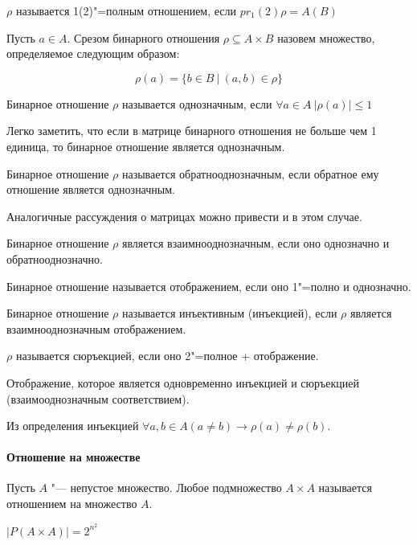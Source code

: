 \begin{definition}
    $\rho$ называется 1(2)"=полным отношением, если $pr_1(2)\rho = A(B)$
\end{definition}

\begin{definition}
    Пусть $a \in A$. Срезом бинарного отношения $\rho \subseteq A \times B$ назовем
    множество, определяемое следующим образом:

    \begin{equation*}
        \rho(a) = \{b \in B ~|~ (a, b) \in \rho\}
    \end{equation*}
\end{definition}

\begin{definition}
    Бинарное отношение $\rho$ называется однозначным, если 
    $\forall a \in A ~| \rho(a)| \leq 1$
\end{definition}

Легко заметить, что если в матрице бинарного отношения не больше чем 1 единица,
то бинарное отношение является однозначным.

\begin{definition}
    Бинарное отношение $\rho$ называется обратнооднозначным, если обратное ему
    отношение является однозначным.
\end{definition}

Аналогичные рассуждения о матрицах можно привести и в этом случае.

\begin{definition}
    Бинарное отношение $\rho$ является взаимнооднозначным, если оно однозначно
    и обратнооднозначно.
\end{definition}

\begin{definition}
    Бинарное отношение называется отображением, если оно 1"=полно и однозначно.
\end{definition}

\begin{definition}
    Бинарное отношение $\rho$ называется инъективным (инъекцией), если $\rho$ является
    взаимнооднозначным отображением.
\end{definition}

$\rho$ называется сюръекцией, если оно 2"=полное + отображение.

Отображение, которое является одновременно инъекцией и 
сюръекцией (взаимооднозначным соответствием).

Из определения инъекцией $\forall a, b \in A (a \neq b) \rightarrow \rho(a) \neq \rho(b)$.

\paragraph{Отношение на множестве}

Пусть $A$ "--- непустое множество. Любое подмножество $A \times A$
называется отношением на множество $A$.

$|P(A \times A)| = 2^{n^2}$






















    
